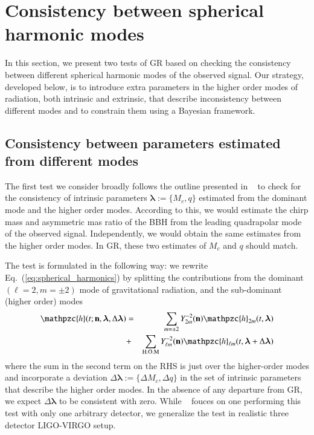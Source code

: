 \documentclass[prd,preprintnumbers,twocolumn,eqsecnum,floatfix,a4paper,nofootinbib,superscriptaddress]{revtex4}
\newcommand{\h}{\mathpzc{h}}
\newcommand{\hlm}{\mathpzc{h}_{\ell m}}
\newcommand{\Ylm}{{Y}^{-2}_{\ell m}}
\newcommand{\blambda}{\bm{\lambda}}
\newcommand{\n}{\mathbf{n}}
\begin{document}
\section{Consistency between spherical harmonic modes}
\label{sec3}
In this section, we present two tests of GR based on checking the consistency between different spherical harmonic modes of the observed signal. Our strategy, developed below, is to introduce extra parameters in the higher order modes of radiation, both intrinsic and extrinsic, that describe inconsistency between different modes and to constrain them using a Bayesian framework. 

\subsection{Consistency between parameters estimated from different modes}
The first test we consider broadly follows the outline presented in ~\cite{dhanpal2018} to check for the consistency of intrinsic parameters $\blambda := \{M_c, q\}$ estimated from the dominant mode and the higher order modes. According to this, we would estimate the chirp mass and asymmetric mas ratio of the BBH from the leading quadrapolar mode of the observed signal. Independently, we would obtain the same estimates from the higher order modes. In GR, these two estimates of $M_c$ and $q$ should match. 

The test is formulated in the following way: we rewrite Eq.~(\ref{eq:spherical_harmonics}) by splitting the contributions from the dominant $(\ell = 2, m = \pm 2)$ mode of gravitational radiation, and the sub-dominant (higher order) modes 
\begin{eqnarray}
\h(t; \n, \blambda, \Delta \blambda) & = & \sum_{m = \pm2} Y^{-2}_{2m} (\n) {\h}_{2m}(t, \blambda)  \nonumber \\ 
& + & \sum _{\text{H.O.M}} \Ylm (\n) \hlm(t, \blambda+\Delta \blambda)
\label{eq:test_HM}
\end{eqnarray}
where the sum in the second term on the RHS is just over the higher-order modes and incorporate a deviation $\Delta \blambda := \{\Delta M_c, \Delta q\}$ in the set of intrinsic parameters that describe the higher order modes. In the absence of any departure from GR, we expect $\Delta \blambda $ to be consistent with zero. While ~\cite{dhanpal2018} fouces on one performing this test with only one arbitrary detector, we generalize the test in realistic three detector LIGO-VIRGO setup.
\end{document}
